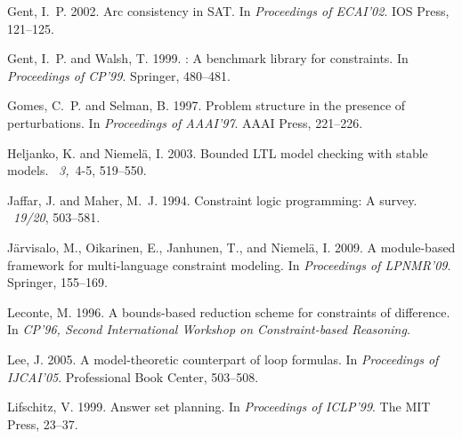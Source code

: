 \documentclass{tlp}
\begin{document}
\begin{thebibliography}{}
{\sc Gent, I.~P.} 2002.
\newblock Arc consistency in {SAT}.
\newblock In {\em Proceedings of ECAI'02}. IOS Press, 121--125.

{\sc Gent, I.~P.} {\sc and} {\sc Walsh, T.} 1999.
: A benchmark library for constraints.
\newblock In {\em Proceedings of CP'99}. Springer, 480--481.

{\sc Gomes, C.~P.} {\sc and} {\sc Selman, B.} 1997.
\newblock Problem structure in the presence of perturbations.
\newblock In {\em Proceedings of AAAI'97}. AAAI Press, 221--226.

{\sc Heljanko, K.} {\sc and} {\sc Niemel{\"a}, I.} 2003.
\newblock Bounded {LTL} model checking with stable models.
~{\em 3,\/}~4-5,
  519--550.

{\sc Jaffar, J.} {\sc and} {\sc Maher, M.~J.} 1994.
\newblock Constraint logic programming: A survey.
~{\em 19/20}, 503--581.

{\sc J{\"a}rvisalo, M.}, {\sc Oikarinen, E.}, {\sc Janhunen, T.}, {\sc and}
  {\sc Niemel{\"a}, I.} 2009.
\newblock A module-based framework for multi-language constraint modeling.
\newblock In {\em Proceedings of LPNMR'09}. Springer, 155--169.

{\sc Leconte, M.} 1996.
\newblock A bounds-based reduction scheme for constraints of difference.
\newblock In {\em CP'96, Second International Workshop on Constraint-based
  Reasoning}.

{\sc Lee, J.} 2005.
\newblock A model-theoretic counterpart of loop formulas.
\newblock In {\em Proceedings of IJCAI'05}. Professional Book Center, 503--508.

{\sc Lifschitz, V.} 1999.
\newblock Answer set planning.
\newblock In {\em Proceedings of ICLP'99}. The MIT Press, 23--37.


\end{thebibliography}
\end{document}

